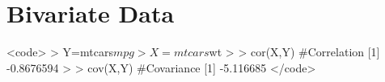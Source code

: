 

\section{Bivariate Data}
 
<code>
> Y=mtcars$mpg
> X=mtcars$wt
>
> cor(X,Y)          #Correlation
[1] -0.8676594
>
> cov(X,Y)          #Covariance
[1] -5.116685
</code>
